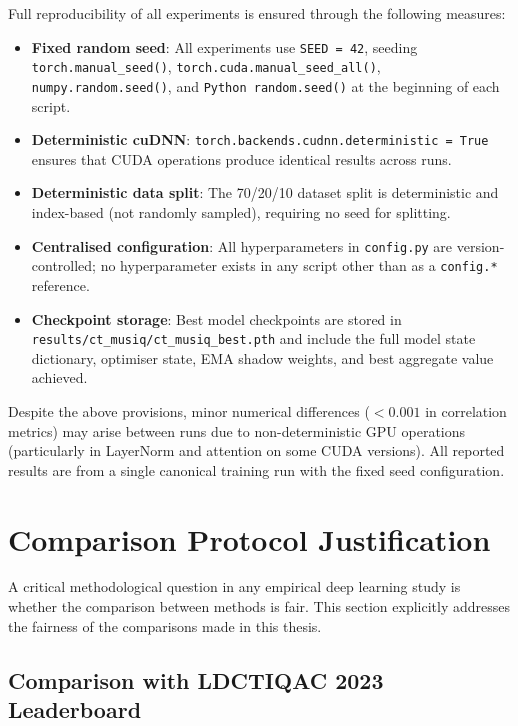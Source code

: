 Full reproducibility of all experiments is ensured through the following measures:

\begin{itemize}
    \item \textbf{Fixed random seed}: All experiments use \texttt{SEED = 42}, seeding
          \texttt{torch.manual\_seed()}, \texttt{torch.cuda.manual\_seed\_all()},
          \texttt{numpy.random.seed()}, and \texttt{Python random.seed()} at the
          beginning of each script.
    \item \textbf{Deterministic cuDNN}: \texttt{torch.backends.cudnn.deterministic = True}
          ensures that CUDA operations produce identical results across runs.
    \item \textbf{Deterministic data split}: The 70/20/10 dataset split is
          deterministic and index-based (not randomly sampled), requiring no seed for
          splitting.
    \item \textbf{Centralised configuration}: All hyperparameters in \texttt{config.py}
          are version-controlled; no hyperparameter exists in any script other than as
          a \texttt{config.*} reference.
    \item \textbf{Checkpoint storage}: Best model checkpoints are stored in
          \texttt{results/ct\_musiq/ct\_musiq\_best.pth} and include the full model
          state dictionary, optimiser state, EMA shadow weights, and best aggregate
          value achieved.
\end{itemize}

Despite the above provisions, minor numerical differences ($< 0.001$ in correlation
metrics) may arise between runs due to non-deterministic GPU operations (particularly
in LayerNorm and attention on some CUDA versions). All reported results are from a single
canonical training run with the fixed seed configuration.

\section{Comparison Protocol Justification}
\label{sec:exp_comparison_protocol}

A critical methodological question in any empirical deep learning study is whether the
comparison between methods is fair. This section explicitly addresses the fairness of
the comparisons made in this thesis.

\subsection{Comparison with LDCTIQAC 2023 Leaderboard}

